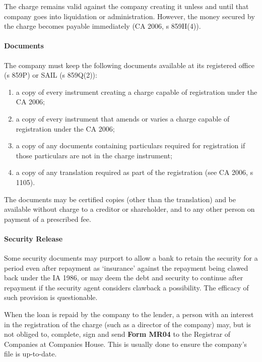 \documentclass[
]{article}
\providecommand{\tightlist}{%
  \setlength{\itemsep}{0pt}\setlength{\parskip}{0pt}}
\begin{document}
The charge remains valid against the company creating it unless and
until that company goes into liquidation or administration. However, the
money secured by the charge becomes payable immediately (CA 2006, s
859H(4)).

\hypertarget{documents}{%
\paragraph{Documents}\label{documents}}

The company must keep the following documents available at its
registered office (s 859P) or SAIL (s 859Q(2)):

\begin{enumerate}
\tightlist
\item
  a copy of every instrument creating a charge capable of registration
  under the CA 2006;
\item
  a copy of every instrument that amends or varies a charge capable of
  registration under the CA 2006;
\item
  a copy of any documents containing particulars required for
  registration if those particulars are not in the charge instrument;
\item
  a copy of any translation required as part of the registration (see CA
  2006, s 1105).
\end{enumerate}

The documents may be certified copies (other than the translation) and
be available without charge to a creditor or shareholder, and to any
other person on payment of a prescribed fee.

\hypertarget{security-release}{%
\paragraph{Security Release}\label{security-release}}

Some security documents may purport to allow a bank to retain the
security for a period even after repayment as `insurance' against the
repayment being clawed back under the IA 1986, or may deem the debt and
security to continue after repayment if the security agent considers
clawback a possibility. The efficacy of such provision is questionable.

When the loan is repaid by the company to the lender, a person with an
interest in the registration of the charge (such as a director of the
company) may, but is not obliged to, complete, sign and send
\textbf{Form MR04} to the Registrar of Companies at Companies House.
This is usually done to ensure the company's file is up-to-date.
\end{document}
